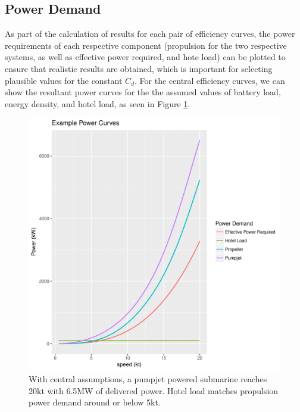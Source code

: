 \documentclass{article}\usepackage[]{graphicx}\usepackage[]{color}
\makeatletter
\def\maxwidth{ %
  \ifdim\Gin@nat@width>\linewidth
    \linewidth
  \else
    \Gin@nat@width
  \fi
}
\newenvironment{knitrout}{}{} %
\makeatother
\begin{document}
\subsection{Power Demand}
As part of the calculation of results for each pair of efficiency curves, the power requirements of each respective component (propulsion for the two respective systems, as well as effective power required, and hote load) can be plotted to ensure that realistic results are obtained, which is important for selecting plausible values for the constant $C_d$.  For the central efficiency curves, we can show the resultant power curves for the the assumed values of battery load, energy density, and hotel load, as seen in Figure \ref{fig:power_curve}.


\begin{figure}
\begin{knitrout}
\color{fgcolor}

{\centering \includegraphics[width=\maxwidth]{figures/plots-plot_power1-1} 

}



\end{knitrout}
\caption{With central assumptions, a pumpjet powered submarine reaches 20kt with 6.5MW of delivered power.  Hotel load matches propulsion power demand around or below 5kt.}
\label{fig:power_curve}
\end{figure}
\end{document}
